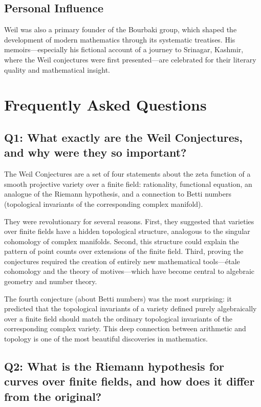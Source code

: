 \subsection{Personal Influence}

Weil was also a primary founder of the Bourbaki group, which shaped the development of modern mathematics through its systematic treatises. His memoirs---especially his fictional account of a journey to Srinagar, Kashmir, where the Weil conjectures were first presented---are celebrated for their literary quality and mathematical insight.

\section{Frequently Asked Questions}

\subsection*{Q1: What exactly are the Weil Conjectures, and why were they so important?}

The Weil Conjectures are a set of four statements about the zeta function of a smooth projective variety over a finite field: rationality, functional equation, an analogue of the Riemann hypothesis, and a connection to Betti numbers (topological invariants of the corresponding complex manifold).

They were revolutionary for several reasons. First, they suggested that varieties over finite fields have a hidden topological structure, analogous to the singular cohomology of complex manifolds. Second, this structure could explain the pattern of point counts over extensions of the finite field. Third, proving the conjectures required the creation of entirely new mathematical tools---\'{e}tale cohomology and the theory of motives---which have become central to algebraic geometry and number theory.

The fourth conjecture (about Betti numbers) was the most surprising: it predicted that the topological invariants of a variety defined purely algebraically over a finite field should match the ordinary topological invariants of the corresponding complex variety. This deep connection between arithmetic and topology is one of the most beautiful discoveries in mathematics.

\subsection*{Q2: What is the Riemann hypothesis for curves over finite fields, and how does it differ from the original?}

